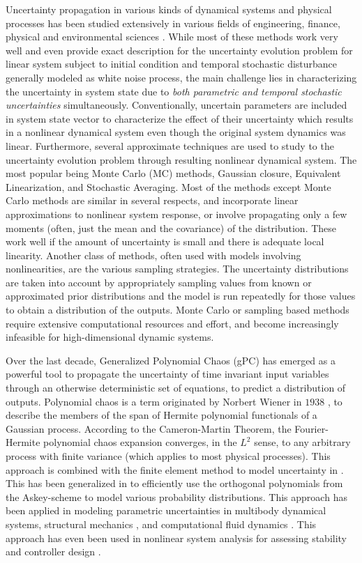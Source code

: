 \documentclass[10pt, conference]{IEEEtran}
\begin{document}
Uncertainty propagation in various kinds of dynamical systems and physical processes has been studied extensively in various fields of engineering, finance, physical and environmental sciences \cite{adelman:86,xie:94,xia:01,rao:05, stott:02}. While most of these methods work very well and even provide exact description for the uncertainty evolution problem for linear system subject to initial condition and temporal stochastic disturbance generally modeled as white noise process, the main challenge lies in characterizing the uncertainty in system state due to \textit{both parametric and temporal stochastic uncertainties} simultaneously.  Conventionally, uncertain parameters are included in system state vector to characterize the effect of their uncertainty which results in a nonlinear dynamical system even though the original system dynamics was linear. Furthermore, several approximate techniques are used to study to the uncertainty evolution problem through resulting nonlinear dynamical system.  The most popular being Monte Carlo (MC) methods\cite{doucet}, Gaussian closure\cite{GaussClosure}, Equivalent Linearization\cite{linear}, and Stochastic Averaging\cite{lefeb1,lefeb2}. Most of the methods except Monte Carlo methods are similar in several respects, and incorporate linear approximations to nonlinear system response, or involve propagating only a few moments (often, just the mean and the covariance) of the distribution. These work well if the amount of uncertainty is small and there is adequate local linearity. Another class of methods, often used with models involving nonlinearities, are the various sampling strategies\cite{Helton:06}. The uncertainty distributions are taken into account by appropriately sampling values from known or approximated prior distributions and the model is run repeatedly for those values to obtain a distribution of the outputs. Monte Carlo or sampling based methods require extensive computational resources and effort, and become increasingly infeasible for high-dimensional dynamic systems\cite{DaumCurse}.

Over the last decade, Generalized Polynomial Chaos (gPC) has emerged as a powerful tool to propagate the uncertainty of time invariant input variables through an otherwise deterministic set of equations, to predict a distribution of outputs. Polynomial chaos is a term originated by Norbert Wiener in $1938$ \cite{wiener}, to describe the members of the span of Hermite polynomial functionals of a Gaussian process. According to the Cameron-Martin Theorem\cite{cameron:47}, the Fourier-Hermite polynomial chaos expansion converges, in the $L^2$ sense, to any arbitrary process with finite variance (which applies to most physical processes). This approach is combined with the finite element method to model uncertainty in \cite{ghanem:91}. This has been generalized in \cite{xiu:02} to efficiently use the orthogonal polynomials from the Askey-scheme to model various probability distributions. This approach has been applied in modeling parametric uncertainties in multibody dynamical systems\cite{sandu:06}, structural mechanics \cite{ghanem:99}, and computational fluid dynamics \cite{najm:09,knio:06}. This approach has even been used in nonlinear system analysis for assessing stability and controller design \cite{hover:06}.
\end{document}
